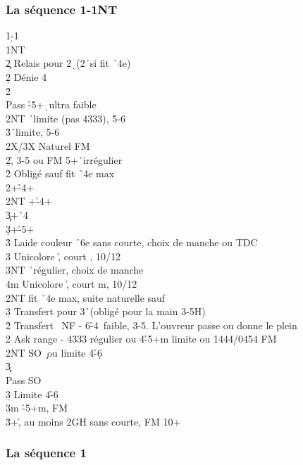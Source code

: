 \documentclass[a4paper]{article}
\begin{document}
\subsubsection{La séquence 1\pdfs-1NT}

\begin{bidtable}
1\d-1\s\\
1NT\+\\
2\c \> Relais pour 2\d\ (2\h\ si fit \h\ 4e)\+\\
2\d \> Dénie 4 \h \\
2\h\+\\
Pass \h -5+\d\ ultra faible\\
2NT \h\ limite (pas 4333), 5-6\\
3\h {}\h\ limite, 5-6\\
2X/3X \> Naturel FM\-\-\\
2\d {}\h , 3-5 ou FM 5+\h\ irrégulier\+\\
2\h \> Obligé sauf fit \h\ 4e max\+\\
2\s {}+\h -4+\s \\
2NT +\h -4+\c \\
3\c {}+\h\ 4\d \\
3\d {}+\h -5+\d \\
3\h \> Laide couleur \h\ 6e sans courte, choix de manche ou TDC\\
3\s \> Unicolore \h , court \s , 10/12\\
3NT \h\ régulier, choix de manche\\
4m \> Unicolore \h , court m, 10/12\-\\
2NT \> fit \h\ 4e max, suite naturelle sauf\+\\
3\d \> Transfert pour 3\h\ (obligé pour la main 3-5H)\-\-\\
2\h \> Transfert \s\ NF - 6\h -4\s\ faible, 3-5. L'ouvreur passe ou donne le plein\\
2\s \> Ask range - 4333 régulier ou 4\h -5+m limite ou 1444/0454 FM\\
2NT \> SO \c\ ou limite 4\h -6\d \+\\
3\c\+\\
Pass \> SO \c \\
3\d \> Limite 4\h -6\d \-\-\\
3m \h -5+m, FM\\
3\h {}+\h , au moins 2GH sans courte, FM 10+\-
\end{bidtable}

\subsubsection{La séquence 1\pdfc}
\end{document}
